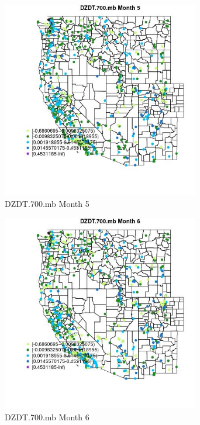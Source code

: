 \begin{figure} 
\centering  
\includegraphics[width=0.77\textwidth]{Code_Outputs/Report_ML_input_PM25_Step4_part_e_de_duplicated_aves_compiled_2019-05-14wNAs_MapObsMo5DZDT700mb.jpg} 
\caption{\label{fig:Report_ML_input_PM25_Step4_part_e_de_duplicated_aves_compiled_2019-05-14wNAsMapObsMo5DZDT700mb}DZDT.700.mb Month 5} 
\end{figure} 
 

\begin{figure} 
\centering  
\includegraphics[width=0.77\textwidth]{Code_Outputs/Report_ML_input_PM25_Step4_part_e_de_duplicated_aves_compiled_2019-05-14wNAs_MapObsMo6DZDT700mb.jpg} 
\caption{\label{fig:Report_ML_input_PM25_Step4_part_e_de_duplicated_aves_compiled_2019-05-14wNAsMapObsMo6DZDT700mb}DZDT.700.mb Month 6} 
\end{figure} 
 

